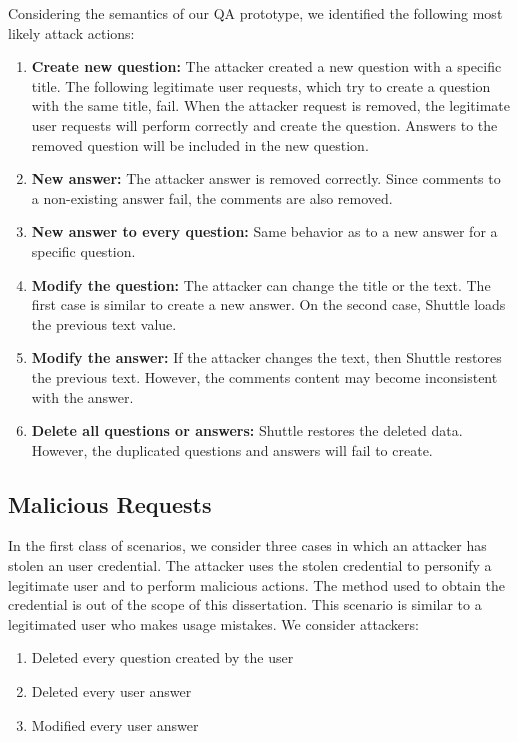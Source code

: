 Considering the semantics of our \ac{QA} prototype, we identified the following most likely attack actions:

\begin{enumerate}
  \item \textbf{Create new question:} The attacker created a new question with a specific title. The following legitimate user requests, which try to create a question with the same title, fail. When the attacker request is removed, the legitimate user requests will perform correctly and create the question. Answers to the removed question will be included in the new question.
  \item \textbf{New answer:} The attacker answer is removed correctly. Since comments to a non-existing answer fail, the comments are also removed.
  \item \textbf{New answer to every question:} Same behavior as to a new answer for a specific question.
  \item \textbf{Modify the question:} The attacker can change the title or the text. The first case is similar to create a new answer. On the second case, Shuttle loads the previous text value.
  \item \textbf{Modify the answer:} If the attacker changes the text, then Shuttle restores the previous text. However, the comments content may become inconsistent with the answer.
  \item \textbf{Delete all questions or answers:} Shuttle restores the deleted data. However, the duplicated questions and answers will fail to create.
\end{enumerate}


\subsection{Malicious Requests}\label{sec:eval:accuracy:requests}
In the first class of scenarios, we consider three cases in which an attacker has stolen an user credential. The attacker uses the stolen credential to personify a legitimate user and to perform malicious actions. The method used to obtain the credential is out of the scope of this dissertation. This scenario is similar to a legitimated user who makes usage mistakes.
We consider attackers:

\begin{enumerate}[label=\alph*]
  \item Deleted every question created by the user
  \item Deleted every user answer
  \item Modified every user answer
\end{enumerate}


